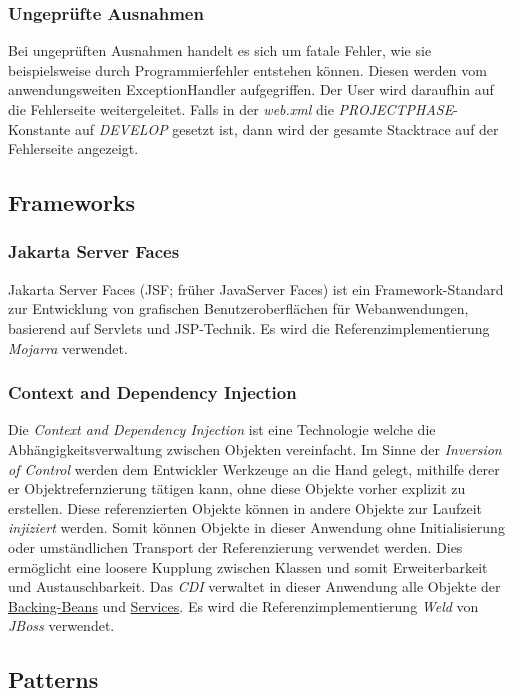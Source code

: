 \subsubsection{Ungeprüfte Ausnahmen}
Bei ungeprüften Ausnahmen handelt es sich um fatale Fehler, wie sie beispielsweise durch
Programmierfehler entstehen können. Diesen werden vom anwendungsweiten
ExceptionHandler %
aufgegriffen. Der User wird daraufhin auf die Fehlerseite %
weitergeleitet.
Falls in der \emph{web.xml} die \emph{PROJECTPHASE}-Konstante auf \emph{DEVELOP} gesetzt ist,
dann wird der gesamte Stacktrace auf der Fehlerseite angezeigt.

\subsection{Frameworks}\label{arch:frameworks}

\subsubsection{Jakarta Server Faces}
Jakarta Server Faces (JSF; früher JavaServer Faces) ist ein Framework-Standard zur
Entwicklung von grafischen Benutzeroberflächen für Webanwendungen, basierend auf Servlets und JSP-Technik.
Es wird die Referenzimplementierung \emph{Mojarra} verwendet.

\subsubsection{Context and Dependency Injection}
Die \emph{Context and Dependency Injection} ist eine Technologie welche die
Abhängigkeitsverwaltung zwischen Objekten vereinfacht. Im Sinne der
\emph{Inversion of Control} werden dem Entwickler Werkzeuge an die Hand gelegt, mithilfe derer
er Objektrefernzierung tätigen kann, ohne diese Objekte vorher explizit zu erstellen.
Diese referenzierten Objekte können in andere Objekte zur Laufzeit \emph{injiziert} werden.
Somit können Objekte in dieser Anwendung ohne Initialisierung oder umständlichen Transport der Referenzierung
verwendet werden.
Dies ermöglicht eine loosere Kupplung zwischen Klassen und somit Erweiterbarkeit
und Austauschbarkeit.
Das \emph{CDI} verwaltet in dieser Anwendung alle Objekte der \hyperref[arch:backing]{Backing-Beans}
und \hyperref[arch:service]{Services}.
Es wird die Referenzimplementierung \emph{Weld} von \emph{JBoss} verwendet.

\subsection{Patterns}\label{arch:patterns}

